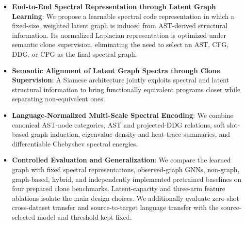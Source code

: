 \documentclass[authoryear,final,5p,times,twocolumn]{elsarticle}
\newcommand{\added}[1]{{\color{green!50!black}#1}}
\theoremstyle{plain}
\begin{document}
\begin{itemize}
    \item \textbf{End-to-End Spectral Representation through Latent Graph
    Learning}: We propose a learnable spectral code representation in which a
    fixed-size, weighted latent graph is induced from AST-derived structural
    information. Its normalized Laplacian representation is optimized under
    semantic clone supervision, eliminating the need to select an AST, CFG,
    DDG, or CPG as the final spectral graph.

    \item \textbf{Semantic Alignment of Latent Graph Spectra through Clone
    Supervision}: A Siamese architecture jointly exploits spectral and latent
    structural information to bring functionally equivalent programs closer
    while separating non-equivalent ones.

    \item \added{\textbf{Language-Normalized Multi-Scale Spectral Encoding}:
    We combine canonical AST-node categories, AST and projected-DDG relations,
    soft slot-based graph induction, eigenvalue-density and heat-trace summaries,
    and differentiable Chebyshev spectral energies.}

    \item \added{\textbf{Controlled Evaluation and Generalization}: We compare
    the learned graph with fixed spectral representations, observed-graph GNNs,
    non-graph, graph-based, hybrid, and independently implemented pretrained
    baselines on four prepared clone benchmarks. Latent-capacity and three-arm
    feature ablations isolate the main design choices. We additionally evaluate
    zero-shot cross-dataset transfer and source-to-target language transfer with
    the source-selected model and threshold kept fixed.}
\end{itemize}



\end{document}

